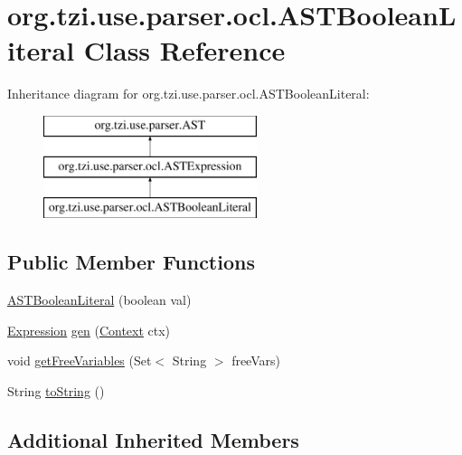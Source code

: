 \hypertarget{classorg_1_1tzi_1_1use_1_1parser_1_1ocl_1_1_a_s_t_boolean_literal}{\section{org.\-tzi.\-use.\-parser.\-ocl.\-A\-S\-T\-Boolean\-Literal Class Reference}
\label{classorg_1_1tzi_1_1use_1_1parser_1_1ocl_1_1_a_s_t_boolean_literal}
}
Inheritance diagram for org.\-tzi.\-use.\-parser.\-ocl.\-A\-S\-T\-Boolean\-Literal\-:\begin{figure}[H]
\begin{center}
\leavevmode
\includegraphics[height=3.000000cm]{classorg_1_1tzi_1_1use_1_1parser_1_1ocl_1_1_a_s_t_boolean_literal}
\end{center}
\end{figure}
\subsection*{Public Member Functions}
\begin{DoxyCompactItemize}
\item 
\hyperlink{classorg_1_1tzi_1_1use_1_1parser_1_1ocl_1_1_a_s_t_boolean_literal_ad03b6214512430cc06c2b8541da33567}{A\-S\-T\-Boolean\-Literal} (boolean val)
\item 
\hyperlink{classorg_1_1tzi_1_1use_1_1uml_1_1ocl_1_1expr_1_1_expression}{Expression} \hyperlink{classorg_1_1tzi_1_1use_1_1parser_1_1ocl_1_1_a_s_t_boolean_literal_ab7ff79d4196aa3210695be04739e5895}{gen} (\hyperlink{classorg_1_1tzi_1_1use_1_1parser_1_1_context}{Context} ctx)
\item 
void \hyperlink{classorg_1_1tzi_1_1use_1_1parser_1_1ocl_1_1_a_s_t_boolean_literal_a9b895c2f3fc15659cd620c725adbfe2a}{get\-Free\-Variables} (Set$<$ String $>$ free\-Vars)
\item 
String \hyperlink{classorg_1_1tzi_1_1use_1_1parser_1_1ocl_1_1_a_s_t_boolean_literal_a5d0417c5b0511b2a516b88636ded8f73}{to\-String} ()
\end{DoxyCompactItemize}
\subsection*{Additional Inherited Members}


